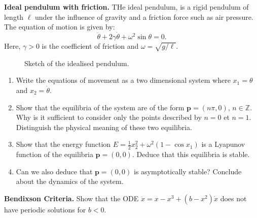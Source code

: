 \documentclass{article}
\begin{document}
\begin{question}
 \textbf{Ideal pendulum with friction.} THe ideal pendulum, is a rigid pendulum of length $\ell$ under the influence of gravity and a friction force such as air pressure. The equation of motion is given by:
 \begin{equation}
   \ddot \theta + 2\gamma \dot \theta + \omega^2 \sin \theta = 0.
 \end{equation}
Here, $\gamma>0$ is the coefficient of friction and $\omega = \sqrt{g/\ell}$.
\begin{figure}[h]
  \centering
  \caption{Sketch of the idealised pendulum.}
\end{figure}

 \begin{enumerate}[label=(\alph*)]
   \item Write the equations of movement as a two dimensional system where $x_1 = \theta$ and $x_2 =\dot \theta$.
    \item Show that the equilibria of the system are of the form $\bm p = (n\pi,0),\,n\in \mathbb Z$. Why is it sufficient to consider only the points described by $n=0$ et $n=1$. Distinguish the physical meaning of these two equilibria.
    \item Show that the energy function $E = \frac12 x_2^2 + \omega^2(1-\cos x_1)$ is a Lyapunov function of the equilibria $\bm p=(0,0)$. Deduce that this equilibria is stable.
    \item Can we also deduce that $\bm p=(0,0)$ is asymptotically stable? Conclude about the dynamics of the system.
    \end{enumerate}
\end{question}

\begin{question}
  \textbf{Bendixson Criteria.} Show that the ODE $\ddot x = x - x^3 + (b-x^2)\dot x$ does not have periodic solutions for $b<0$.
  
\end{question}

 
\end{document}
